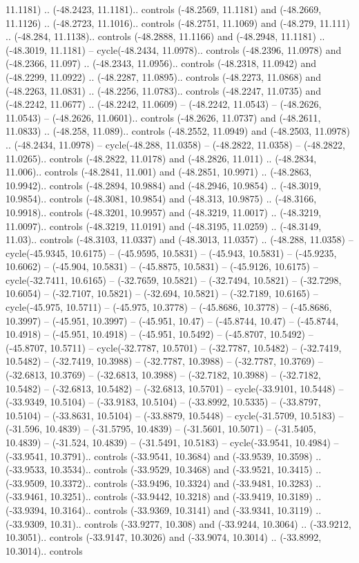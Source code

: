\begin{scope}[shift={(2.5552, 9.9912)}]
\begin{scope}[shift={(48.1654, -14.8546)}]
11.1181) .. (-48.2423, 11.1181).. controls (-48.2569, 11.1181) and (-48.2669, 11.1126) .. (-48.2723, 11.1016).. controls (-48.2751, 11.1069) and (-48.279, 11.111) .. (-48.284, 11.1138).. controls (-48.2888, 11.1166) and (-48.2948, 11.1181) .. (-48.3019, 11.1181) -- cycle(-48.2434, 11.0978).. controls (-48.2396, 11.0978) and (-48.2366, 11.097) .. (-48.2343, 11.0956).. controls (-48.2318, 11.0942) and (-48.2299, 11.0922) .. (-48.2287, 11.0895).. controls (-48.2273, 11.0868) and (-48.2263, 11.0831) .. (-48.2256, 11.0783).. controls (-48.2247, 11.0735) and (-48.2242, 11.0677) .. (-48.2242, 11.0609) -- (-48.2242, 11.0543) -- (-48.2626, 11.0543) -- (-48.2626, 11.0601).. controls (-48.2626, 11.0737) and (-48.2611, 11.0833) .. (-48.258, 11.089).. controls (-48.2552, 11.0949) and (-48.2503, 11.0978) .. (-48.2434, 11.0978) -- cycle(-48.288, 11.0358) -- (-48.2822, 11.0358) -- (-48.2822, 11.0265).. controls (-48.2822, 11.0178) and (-48.2826, 11.011) .. (-48.2834, 11.006).. controls (-48.2841, 11.001) and (-48.2851, 10.9971) .. (-48.2863, 10.9942).. controls (-48.2894, 10.9884) and (-48.2946, 10.9854) .. (-48.3019, 10.9854).. controls (-48.3081, 10.9854) and (-48.313, 10.9875) .. (-48.3166, 10.9918).. controls (-48.3201, 10.9957) and (-48.3219, 11.0017) .. (-48.3219, 11.0097).. controls (-48.3219, 11.0191) and (-48.3195, 11.0259) .. (-48.3149, 11.03).. controls (-48.3103, 11.0337) and (-48.3013, 11.0357) .. (-48.288, 11.0358) -- cycle(-45.9345, 10.6175) -- (-45.9595, 10.5831) -- (-45.943, 10.5831) -- (-45.9235, 10.6062) -- (-45.904, 10.5831) -- (-45.8875, 10.5831) -- (-45.9126, 10.6175) -- cycle(-32.7411, 10.6165) -- (-32.7659, 10.5821) -- (-32.7494, 10.5821) -- (-32.7298, 10.6054) -- (-32.7107, 10.5821) -- (-32.694, 10.5821) -- (-32.7189, 10.6165) -- cycle(-45.975, 10.5711) -- (-45.975, 10.3778) -- (-45.8686, 10.3778) -- (-45.8686, 10.3997) -- (-45.951, 10.3997) -- (-45.951, 10.47) -- (-45.8744, 10.47) -- (-45.8744, 10.4918) -- (-45.951, 10.4918) -- (-45.951, 10.5492) -- (-45.8707, 10.5492) -- (-45.8707, 10.5711) -- cycle(-32.7787, 10.5701) -- (-32.7787, 10.5482) -- (-32.7419, 10.5482) -- (-32.7419, 10.3988) -- (-32.7787, 10.3988) -- (-32.7787, 10.3769) -- (-32.6813, 10.3769) -- (-32.6813, 10.3988) -- (-32.7182, 10.3988) -- (-32.7182, 10.5482) -- (-32.6813, 10.5482) -- (-32.6813, 10.5701) -- cycle(-33.9101, 10.5448) -- (-33.9349, 10.5104) -- (-33.9183, 10.5104) -- (-33.8992, 10.5335) -- (-33.8797, 10.5104) -- (-33.8631, 10.5104) -- (-33.8879, 10.5448) -- cycle(-31.5709, 10.5183) -- (-31.596, 10.4839) -- (-31.5795, 10.4839) -- (-31.5601, 10.5071) -- (-31.5405, 10.4839) -- (-31.524, 10.4839) -- (-31.5491, 10.5183) -- cycle(-33.9541, 10.4984) -- (-33.9541, 10.3791).. controls (-33.9541, 10.3684) and (-33.9539, 10.3598) .. (-33.9533, 10.3534).. controls (-33.9529, 10.3468) and (-33.9521, 10.3415) .. (-33.9509, 10.3372).. controls (-33.9496, 10.3324) and (-33.9481, 10.3283) .. (-33.9461, 10.3251).. controls (-33.9442, 10.3218) and (-33.9419, 10.3189) .. (-33.9394, 10.3164).. controls (-33.9369, 10.3141) and (-33.9341, 10.3119) .. (-33.9309, 10.31).. controls (-33.9277, 10.308) and (-33.9244, 10.3064) .. (-33.9212, 10.3051).. controls (-33.9147, 10.3026) and (-33.9074, 10.3014) .. (-33.8992, 10.3014).. controls 
\end{scope}
\end{scope}
